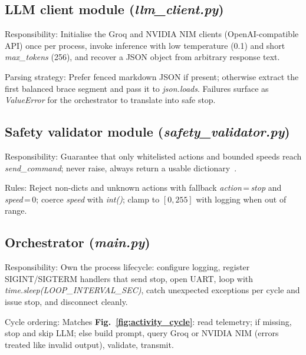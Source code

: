 \subsection[LLM client module]{LLM client module (\textit{llm\_client.py})}
\label{subsec:llm}

Responsibility: Initialise the Groq and NVIDIA NIM clients (OpenAI-compatible API) once per process, invoke inference with low temperature (0.1) and short \textit{max\_tokens} (256), and recover a JSON object from arbitrary response text.

Parsing strategy: Prefer fenced markdown JSON if present; otherwise extract the first balanced brace segment and pass it to \textit{json.loads}. Failures surface as \textit{ValueError} for the orchestrator to translate into safe stop.

\subsection[Safety validator module]{Safety validator module (\textit{safety\_validator.py})}
\label{subsec:val}

Responsibility: Guarantee that only whitelisted actions and bounded speeds reach \textit{send\_command}; never raise, always return a usable dictionary~\cite{huang2023grounded}.

Rules: Reject non-dicts and unknown actions with fallback \textit{action}\,=\,\textit{stop} and \textit{speed}\,=\,0; coerce \textit{speed} with \textit{int()}; clamp to $[0,255]$ with logging when out of range.

\subsection[Orchestrator]{Orchestrator (\textit{main.py})}
\label{subsec:main}

Responsibility: Own the process lifecycle: configure logging, register SIGINT/SIGTERM handlers that send stop, open UART, loop with \textit{time.sleep(LOOP\_INTERVAL\_SEC)}, catch unexpected exceptions per cycle and issue stop, and disconnect cleanly.

Cycle ordering: Matches \textbf{Fig.~\ref{fig:activity_cycle}}: read telemetry; if missing, stop and skip LLM; else build prompt, query Groq or NVIDIA NIM (errors treated like invalid output), validate, transmit.

